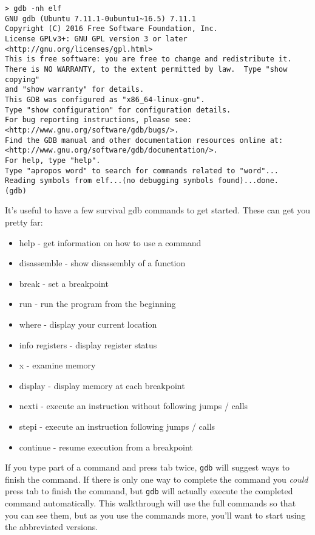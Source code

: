 \begin{lstlisting}
> gdb -nh elf
GNU gdb (Ubuntu 7.11.1-0ubuntu1~16.5) 7.11.1
Copyright (C) 2016 Free Software Foundation, Inc.
License GPLv3+: GNU GPL version 3 or later <http://gnu.org/licenses/gpl.html>
This is free software: you are free to change and redistribute it.
There is NO WARRANTY, to the extent permitted by law.  Type "show copying"
and "show warranty" for details.
This GDB was configured as "x86_64-linux-gnu".
Type "show configuration" for configuration details.
For bug reporting instructions, please see:
<http://www.gnu.org/software/gdb/bugs/>.
Find the GDB manual and other documentation resources online at:
<http://www.gnu.org/software/gdb/documentation/>.
For help, type "help".
Type "apropos word" to search for commands related to "word"...
Reading symbols from elf...(no debugging symbols found)...done.
(gdb) 
\end{lstlisting}

It's useful to have a few survival gdb commands to get started. These can get
you pretty far:

\begin{itemize}
    \item help - get information on how to use a command
    \item disassemble - show disassembly of a function
    \item break - set a breakpoint
    \item run - run the program from the beginning
    \item where - display your current location
    \item info registers - display register status
    \item x - examine memory
    \item display - display memory at each breakpoint
    \item nexti - execute an instruction without following jumps / calls
    \item stepi - execute an instruction following jumps / calls
    \item continue - resume execution from a breakpoint
\end{itemize}

If you type part of a command and press tab twice, \texttt{gdb} will suggest
ways to finish the command. If there is only one way to complete the command you
\emph{could} press tab to finish the command, but \texttt{gdb} will actually
execute the completed command automatically. This walkthrough will use the full
commands so that you can see them, but as you use the commands more, you'll want
to start using the abbreviated versions.

